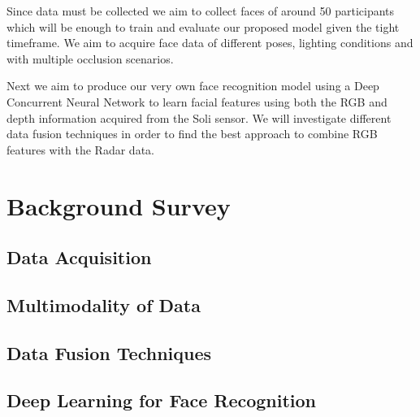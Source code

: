 \documentclass{interim}
\begin{document}
Since data must be collected we aim to collect faces of around 50 participants which will be enough to train and evaluate our proposed model given the tight timeframe. We aim to acquire face data of different poses, lighting conditions and with multiple occlusion scenarios.

Next we aim to produce our very own face recognition model using a Deep Concurrent Neural Network to learn facial features using both the RGB and depth information acquired from the Soli sensor. We will investigate different data fusion techniques in order to find the best approach to combine RGB features with the Radar data.



\section{Background Survey}



\subsection{Data Acquisition}

\subsection{Multimodality of Data}

\subsection{Data Fusion Techniques}

\subsection{Deep Learning for Face Recognition}
\end{document}
